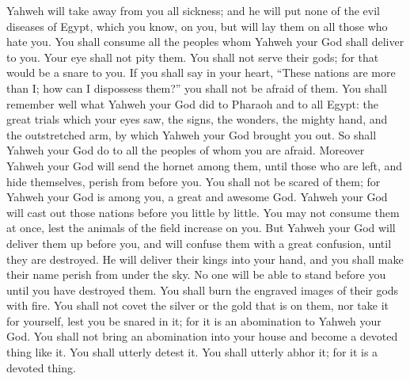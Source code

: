 {Yahweh will take away from you all sickness; and he will put none of the evil diseases of Egypt, which you know, on you, but will lay them on all those who hate you.
You shall consume all the peoples whom Yahweh your God shall deliver to you. Your eye shall not pity them. You shall not serve their gods; for that would be a snare to you.
If you shall say in your heart, “These nations are more than I; how can I dispossess them?”
you shall not be afraid of them. You shall remember well what Yahweh your God did to Pharaoh and to all Egypt:
the great trials which your eyes saw, the signs, the wonders, the mighty hand, and the outstretched arm, by which Yahweh your God brought you out. So shall Yahweh your God do to all the peoples of whom you are afraid.
Moreover Yahweh your God will send the hornet among them, until those who are left, and hide themselves, perish from before you.
You shall not be scared of them; for Yahweh your God is among you, a great and awesome God.
Yahweh your God will cast out those nations before you little by little. You may not consume them at once, lest the animals of the field increase on you.
But Yahweh your God will deliver them up before you, and will confuse them with a great confusion, until they are destroyed.
He will deliver their kings into your hand, and you shall make their name perish from under the sky. No one will be able to stand before you until you have destroyed them.
You shall burn the engraved images of their gods with fire. You shall not covet the silver or the gold that is on them, nor take it for yourself, lest you be snared in it; for it is an abomination to Yahweh your God.
You shall not bring an abomination into your house and become a devoted thing like it. You shall utterly detest it. You shall utterly abhor it; for it is a devoted thing.

}
